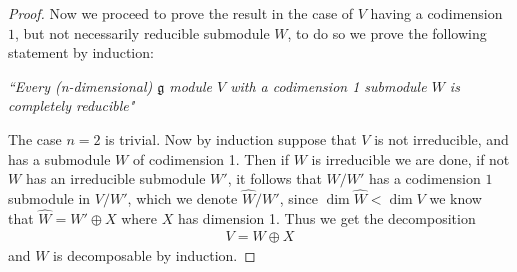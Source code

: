 \documentclass[10.5pt]{article}
\theoremstyle{definition}
\numberwithin{example}{subsection}
\numberwithin{pb}{subsection}
\begin{document}
\begin{proof}
        Now we proceed to prove the result in the case of \(V\) having a codimension \(1\), but not necessarily reducible submodule \(W\), to do so we prove the following statement by induction:
        
        \emph{``Every (n-dimensional) \(\mathfrak{g}\) module \(V\) with a codimension 1 submodule \(W\) is completely reducible"}

        The case \(n=2\) is trivial. Now by induction suppose that \(V\) is not irreducible, and has a submodule \(W\) of codimension 1. Then if \(W\) is irreducible we are done, if not \(W\) has an irreducible submodule \(W'\), it follows that \(W/W'\) has a codimension \(1\) submodule in \(V/W'\), which we denote \(\hat{W}/W'\), since \(\dim \hat{W} < \dim V\) we know that \(\hat{W} = W' \oplus X\) where \(X\) has dimension 1. Thus we get the decomposition
        \begin{align}
            V = W \oplus X
        \end{align}
        and \(W\) is decomposable by induction.
    \end{proof}
\end{document}
